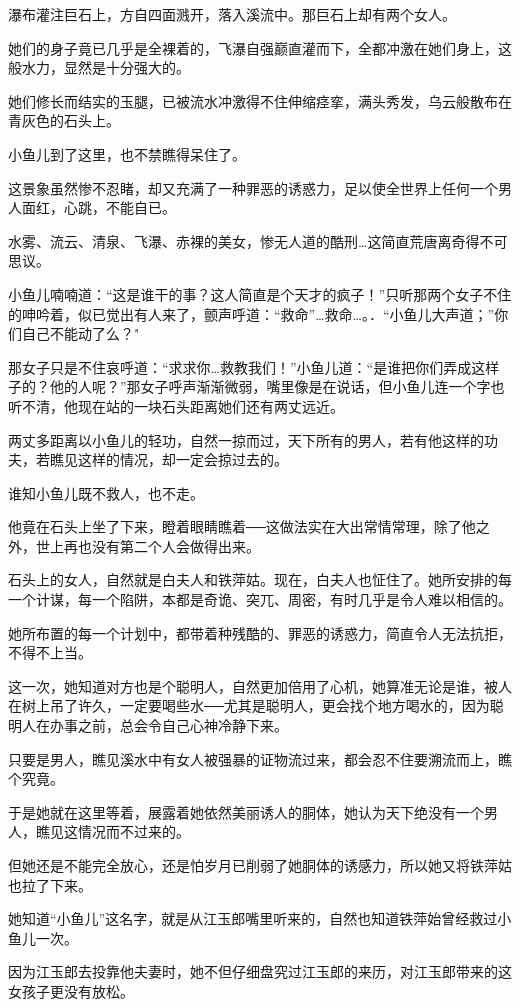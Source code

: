 \documentclass[12pt,oneside]{book}
\begin{document}
瀑布灌注巨石上，方自四面溅开，落入溪流中。那巨石上却有两个女人。

她们的身子竟已几乎是全裸着的，飞瀑自强巅直灌而下，全都冲激在她们身上，这般水力，显然是十分强大的。

她们修长而结实的玉腿，已被流水冲激得不住伸缩痉挛，满头秀发，乌云般散布在青灰色的石头上。

小鱼儿到了这里，也不禁瞧得呆住了。

这景象虽然惨不忍睹，却又充满了一种罪恶的诱惑力，足以使全世界上任何一个男人面红，心跳，不能自已。

水雾、流云、清泉、飞瀑、赤裸的美女，惨无人道的酷刑\ldots 这简直荒唐离奇得不可思议。

小鱼儿喃喃道：``这是谁干的事？这人简直是个天才的疯子！''只听那两个女子不住的呻吟着，似已觉出有人来了，颤声呼道：``救命''\ldots 救命\ldots。．``小鱼儿大声道；''你们自己不能动了么？"

那女子只是不住哀呼道：``求求你\ldots 救教我们！''小鱼儿道：``是谁把你们弄成这样子的？他的人呢？''那女子呼声渐渐微弱，嘴里像是在说话，但小鱼儿连一个字也听不清，他现在站的一块石头距离她们还有两丈远近。

两丈多距离以小鱼儿的轻功，自然一掠而过，天下所有的男人，若有他这样的功夫，若瞧见这样的情况，却一定会掠过去的。

谁知小鱼儿既不救人，也不走。

他竟在石头上坐了下来，瞪着眼睛瞧着──这做法实在大出常情常理，除了他之外，世上再也没有第二个人会做得出来。

石头上的女人，自然就是白夫人和铁萍姑。现在，白夫人也怔住了。她所安排的每一个计谋，每一个陷阱，本都是奇诡、突兀、周密，有时几乎是令人难以相信的。

她所布置的每一个计划中，都带着种残酷的、罪恶的诱惑力，简直令人无法抗拒，不得不上当。

这一次，她知道对方也是个聪明人，自然更加倍用了心机，她算准无论是谁，被人在树上吊了许久，一定要喝些水──尤其是聪明人，更会找个地方喝水的，因为聪明人在办事之前，总会令自己心神冷静下来。

只要是男人，瞧见溪水中有女人被强暴的证物流过来，都会忍不住要溯流而上，瞧个究竟。

于是她就在这里等着，展露着她依然美丽诱人的胴体，她认为天下绝没有一个男人，瞧见这情况而不过来的。

但她还是不能完全放心，还是怕岁月已削弱了她胴体的诱感力，所以她又将铁萍姑也拉了下来。

她知道``小鱼儿''这名字，就是从江玉郎嘴里听来的，自然也知道铁萍始曾经救过小鱼儿一次。

因为江玉郎去投靠他夫妻时，她不但仔细盘究过江玉郎的来历，对江玉郎带来的这女孩子更没有放松。
\end{document}
